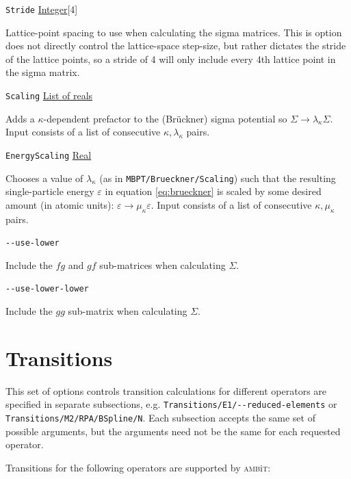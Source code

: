 \documentclass{report}
\newcommand{\ambit}{\textsc{amb}{\footnotesize i}\textsc{t}}
\begin{document}
\texttt{Stride} \uline{Integer}[4]
\begin{adjustwidth}{1cm}{}
Lattice-point spacing to use when calculating the sigma matrices. This is option does not directly
control the lattice-space step-size, but rather dictates the stride of the lattice points, so a stride
of 4 will only include every 4th lattice point in the sigma matrix.
\end{adjustwidth}

\texttt{Scaling} \uline{List of reals}
\begin{adjustwidth}{1cm}{}
Adds a $\kappa$-dependent prefactor to the (Br\"{u}ckner) sigma potential so $\Sigma \to
\lambda_{\kappa}\Sigma$. Input consists of a list of consecutive $\kappa, \lambda_{\kappa}$ pairs.
\end{adjustwidth}

\texttt{EnergyScaling} \uline{Real}
\begin{adjustwidth}{1cm}{}
Chooses a value of $\lambda_{\kappa}$ (as in \texttt{MBPT/Brueckner/Scaling}) such that the resulting
single-particle energy $\varepsilon$ in equation \ref{eq:brueckner} is scaled by some desired amount (in
atomic units): $\varepsilon \to \mu_{\kappa} \varepsilon$. Input consists of a list of consecutive
$\kappa, \mu_{\kappa}$ pairs.
\end{adjustwidth}

\texttt{{-}{-}use-lower}
\begin{adjustwidth}{1cm}{}
Include the $fg$ and $gf$ sub-matrices when calculating $\Sigma$.
\end{adjustwidth}

\texttt{{-}{-}use-lower-lower}
\begin{adjustwidth}{1cm}{}
Include the $gg$ sub-matrix when calculating $\Sigma$.
\end{adjustwidth}

\section{Transitions}

This set of options controls transition calculations for different operators are specified in separate 
subsections, e.g. \texttt{Transitions/E1/{-}{-}reduced-elements} or 
\texttt{Transitions/M2/RPA/BSpline/N}. Each subsection accepts the same set 
of possible arguments, but the arguments need not be the same for each requested operator. 

Transitions for the following operators are supported by \ambit:
\end{document}
